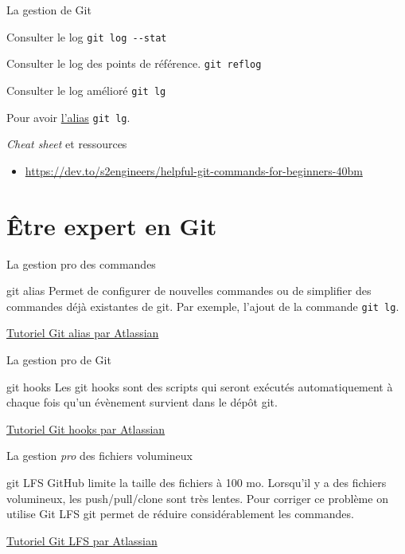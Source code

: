 \documentclass[11pt]{beamer}
\begin{document}
\begin{frame}[fragile]{La gestion de Git}
	\begin{block}{Consulter le log}
		\verb|git log --stat|
	\end{block}
	\begin{block}{Consulter le log des points de référence.}
		\verb|git reflog| 
	\end{block}
	\begin{block}{Consulter le log amélioré}
		\verb|git lg|
	\end{block}
	Pour avoir \href{https://gist.github.com/johanmeiring/3002458}{l'alias} \verb|git lg|.
\end{frame}

\begin{frame}[fragile]{\textit{Cheat sheet} et ressources}
	\begin{itemize}
		\item \url{https://dev.to/s2engineers/helpful-git-commands-for-beginners-40bm}
	\end{itemize}
\end{frame}



\section{Être expert en Git}

\begin{frame}[fragile]{La gestion pro des commandes}
	\begin{block}{git alias}
		Permet de configurer de nouvelles commandes ou de simplifier des commandes déjà existantes de git. Par exemple, l'ajout de la commande \verb|git lg|.
	\end{block}
\href{https://www.atlassian.com/git/tutorials/git-alias}{Tutoriel Git alias par Atlassian}
\end{frame}

\begin{frame}[fragile]{La gestion pro de Git}
	\begin{block}{git hooks}
		Les git hooks sont des scripts qui seront exécutés automatiquement à chaque fois qu'un évènement survient dans le dépôt git. 
	\end{block}
\href{https://www.atlassian.com/git/tutorials/git-hooks}{Tutoriel Git hooks par Atlassian}
\end{frame}

\begin{frame}[fragile]{La gestion \textit{pro} des fichiers volumineux}
	\begin{block}{git LFS} 
		GitHub limite la taille des fichiers à 100 mo. Lorsqu'il y a des fichiers volumineux, les push/pull/clone sont très lentes. Pour corriger ce problème on utilise Git LFS git permet de réduire considérablement les commandes.
	\end{block}
	\href{https://www.atlassian.com/git/tutorials/git-lfs}{Tutoriel Git LFS par Atlassian}
\end{frame}
\end{document}
